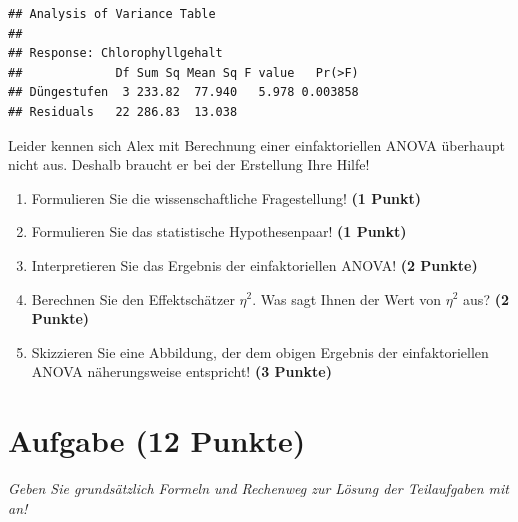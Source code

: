 \documentclass[a4paper, 9pt]{scrartcl}\usepackage[]{graphicx}\usepackage[]{xcolor}
\makeatletter
\newenvironment{kframe}{%
 \def\at@end@of@kframe{}%
 \ifinner\ifhmode%
  \def\at@end@of@kframe{\end{minipage}}%
  \begin{minipage}{\columnwidth}%
 \fi\fi%
 \def\FrameCommand##1{\hskip\@totalleftmargin \hskip-\fboxsep
 \colorbox{shadecolor}{##1}\hskip-\fboxsep
     \hskip-\linewidth \hskip-\@totalleftmargin \hskip\columnwidth}%
 \MakeFramed {\advance\hsize-\width
   \@totalleftmargin\z@ \linewidth\hsize
   \@setminipage}}%
 {\par\unskip\endMakeFramed%
 \at@end@of@kframe}
\newenvironment{knitrout}{}{} %
\makeatother
\begin{document}
\begin{knitrout}
\color{fgcolor}\begin{kframe}
\begin{verbatim}
## Analysis of Variance Table
## 
## Response: Chlorophyllgehalt
##             Df Sum Sq Mean Sq F value   Pr(>F)
## Düngestufen  3 233.82  77.940   5.978 0.003858
## Residuals   22 286.83  13.038
\end{verbatim}
\end{kframe}
\end{knitrout}

\vspace{1ex}

Leider kennen sich Alex mit Berechnung einer einfaktoriellen ANOVA überhaupt nicht aus. Deshalb braucht er bei der Erstellung Ihre Hilfe! 

\begin{enumerate}
  \item Formulieren Sie die wissenschaftliche Fragestellung! \textbf{(1 Punkt)}
  \item Formulieren Sie das statistische Hypothesenpaar! \textbf{(1 Punkt)}
\item Interpretieren Sie das Ergebnis der einfaktoriellen ANOVA! \textbf{(2 Punkte)} 
\item Berechnen Sie den Effektschätzer $\eta^2$. Was sagt Ihnen der Wert von $\eta^2$ aus? \textbf{(2 Punkte)}
\item Skizzieren Sie eine Abbildung, der dem obigen Ergebnis der
  einfaktoriellen ANOVA näherungsweise entspricht! \textbf{(3 Punkte)}
\end{enumerate}

 
\clearpage

\section{Aufgabe \hfill (12 Punkte)}

\textit{Geben Sie grundsätzlich Formeln und Rechenweg zur Lösung der Teilaufgaben mit an!} \\[1Ex]
 
\end{document}
